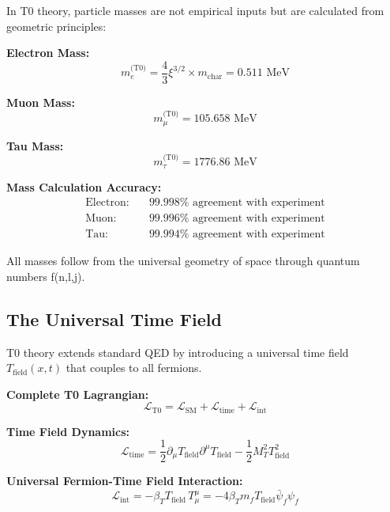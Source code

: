 \documentclass[12pt,a4paper]{article}
\numberwithin{equation}{section}
\newcommand{\calL}{\mathcal{L}}
\begin{document}
	In T0 theory, particle masses are not empirical inputs but are calculated from geometric principles:
	
	\textbf{Electron Mass:}
	\begin{equation}
		m_e^{\text{(T0)}} = \frac{4}{3} \xi^{3/2} \times m_{\text{char}} = 0.511 \text{ MeV}
	\end{equation}
	
	\textbf{Muon Mass:}
	\begin{equation}
		m_\mu^{\text{(T0)}} = 105.658 \text{ MeV}
	\end{equation}
	
	\textbf{Tau Mass:}
	\begin{equation}
		m_\tau^{\text{(T0)}} = 1776.86 \text{ MeV}
	\end{equation}
	
	\begin{t0calculation}
		\textbf{Mass Calculation Accuracy:}
		\begin{align}
			\text{Electron:} &\quad 99.998\% \text{ agreement with experiment}\\
			\text{Muon:} &\quad 99.996\% \text{ agreement with experiment}\\
			\text{Tau:} &\quad 99.994\% \text{ agreement with experiment}
		\end{align}
		
		All masses follow from the universal geometry of space through quantum numbers f(n,l,j).
	\end{t0calculation}
	
	\subsection{The Universal Time Field}
	
	T0 theory extends standard QED by introducing a universal time field $T_{\text{field}}(x,t)$ that couples to all fermions.
	
	\textbf{Complete T0 Lagrangian:}
	\begin{equation}
		\calL_{\text{T0}} = \calL_{\text{SM}} + \calL_{\text{time}} + \calL_{\text{int}}
	\end{equation}
	
	\textbf{Time Field Dynamics:}
	\begin{equation}
		\calL_{\text{time}} = \frac{1}{2}\partial_\mu T_{\text{field}} \partial^\mu T_{\text{field}} - \frac{1}{2}M_T^2 T_{\text{field}}^2
	\end{equation}
	
	\textbf{Universal Fermion-Time Field Interaction:}
	\begin{equation}
		\calL_{\text{int}} = -\beta_T T_{\text{field}} \, T^\mu_\mu = -4\beta_T m_f T_{\text{field}} \bar{\psi}_f \psi_f
	\end{equation}
	
\end{document}
